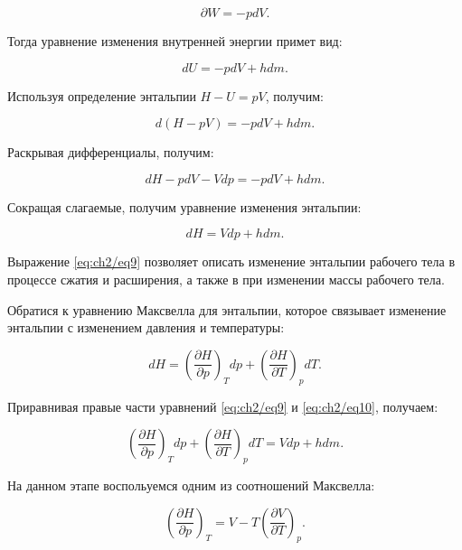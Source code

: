\begin{equation*}
    \partial W = -pdV.
\end{equation*}

Тогда уравнение изменения внутренней энергии примет вид:

\begin{equation*}
    dU = -pdV + hdm.
\end{equation*}

Используя определение энтальпии $H - U = pV$, получим:

\begin{equation*}
    d(H-pV) = -pdV + hdm.
\end{equation*}

Раскрывая дифференциалы, получим:

\begin{equation*}
    dH - pdV - Vdp = -pdV + hdm.
\end{equation*}

Сокращая слагаемые, получим уравнение изменения энтальпии:

\begin{equation}\label{eq:ch2/eq9}
    dH = Vdp + hdm.
\end{equation}

Выражение \eqref{eq:ch2/eq9} позволяет описать изменение энтальпии рабочего тела в процессе сжатия и
расширения, а также в при изменении массы рабочего тела.

Обратися к уравнению Максвелла для энтальпии, которое связывает изменение энтальпии с изменением давления и температуры:

\begin{equation}\label{eq:ch2/eq10}
    dH = \left(
    \frac{\partial H}{\partial p}
    \right)_T dp + \left(
    \frac{\partial H}{\partial T}
    \right)_p dT.
\end{equation}

Приравнивая правые части уравнений \eqref{eq:ch2/eq9} и \eqref{eq:ch2/eq10}, получаем:

\begin{equation}\label{eq:ch2/eq11}
    \left(
    \frac{\partial H}{\partial p}
    \right)_T dp + \left(
    \frac{\partial H}{\partial T}
    \right)_p dT = Vdp + hdm.
\end{equation}

На данном этапе воспольуемся одним из соотношений Максвелла:

\begin{equation*}
    \left(
    \frac{\partial H}{\partial p}
    \right)_T = V - T \left(
    \frac{\partial V}{\partial T}
    \right)_p.
\end{equation*}

